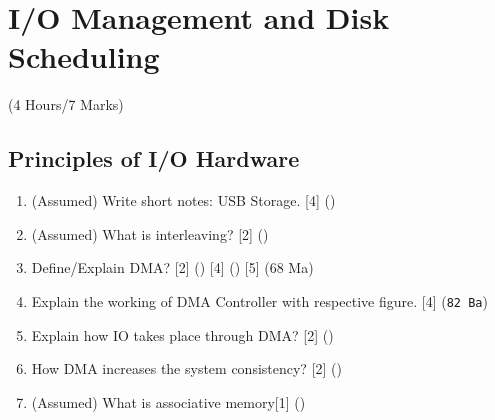 \documentclass[12pt]{article}
\begin{document}
	\pagebreak

\section{I/O Management and Disk Scheduling}
	\begin{center}(4 Hours/7 Marks)\end{center}
	\subsection{Principles of I/O Hardware}
		\begin{enumerate}[noitemsep, topsep=0pt]
			\item (Assumed) Write short notes: USB Storage. \hfill [4] ()

			\item (Assumed) What is interleaving? \hfill [2] ()
			
			\item Define/Explain DMA? \hfill [2] () [4] () [5] (68 Ma)
			
			\item Explain the working of DMA Controller with respective figure. \hfill [4] (\texttt{82 Ba})

			\item Explain how IO takes place through DMA? \hfill [2] ()

			\item How DMA increases the system consistency? \hfill [2] ()

			\item (Assumed) What is associative memory\hfill [1] ()
		\end{enumerate}
\end{document}
